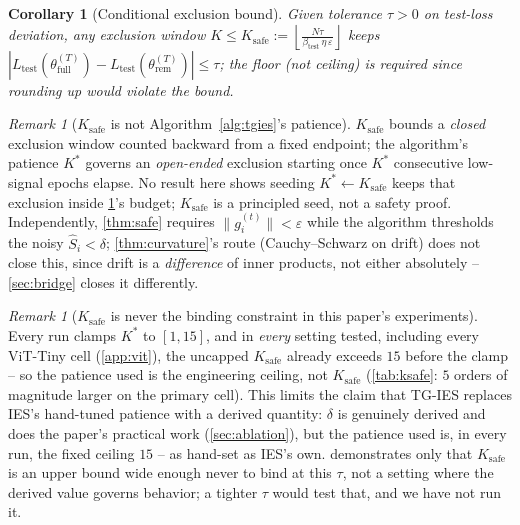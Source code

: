 \documentclass{article}
\theoremstyle{plain}
\newtheorem{corollary}[theorem]{Corollary}
\theoremstyle{definition}
\theoremstyle{remark}
\newtheorem{remark}[theorem]{Remark}
\begin{document}
\begin{corollary}[Conditional exclusion bound]
\label{cor:kstar}
Given tolerance $\tau>0$ on test-loss deviation, any exclusion window $K \le K_{\mathrm{safe}} := \left\lfloor \frac{N\tau}{\beta_{\mathrm{test}}\,\eta\,\varepsilon} \right\rfloor$ keeps $|L_{\mathrm{test}}(\theta^{(T)}_{\mathrm{full}})-L_{\mathrm{test}}(\theta^{(T)}_{\mathrm{rem}})|\le\tau$; the floor (not ceiling) is required since rounding up would violate the bound.
\end{corollary}
\begin{remark}[$K_{\mathrm{safe}}$ is not Algorithm~\ref{alg:tgies}'s patience]
\label{rem:kmismatch}
$K_{\mathrm{safe}}$ bounds a \emph{closed} exclusion window counted backward from a fixed endpoint; the algorithm's patience $K^*$ governs an \emph{open-ended} exclusion starting once $K^*$ consecutive low-signal epochs elapse. No result here shows seeding $K^*\leftarrow K_{\mathrm{safe}}$ keeps that exclusion inside \cref{cor:kstar}'s budget; $K_{\mathrm{safe}}$ is a principled seed, not a safety proof. Independently, \cref{thm:safe} requires $\|g_i^{(t)}\|<\varepsilon$ while the algorithm thresholds the noisy $\hat S_i<\delta$; \cref{thm:curvature}'s route (Cauchy--Schwarz on drift) does not close this, since drift is a \emph{difference} of inner products, not either absolutely -- \cref{sec:bridge} closes it differently.
\end{remark}

\begin{remark}[$K_{\mathrm{safe}}$ is never the binding constraint in this paper's experiments]
\label{rem:ksafe-nonbinding}
Every run clamps $K^*$ to $[1,15]$, and in \emph{every} setting tested, including every ViT-Tiny cell (\cref{app:vit}), the uncapped $K_{\mathrm{safe}}$ already exceeds $15$ before the clamp -- so the patience used is the engineering ceiling, not $K_{\mathrm{safe}}$ (\cref{tab:ksafe}: $5$ orders of magnitude larger on the primary cell). This limits the claim that TG-IES replaces IES's hand-tuned patience with a derived quantity: $\delta$ is genuinely derived and does the paper's practical work (\cref{sec:ablation}), but the patience used is, in every run, the fixed ceiling $15$ -- as hand-set as IES's own.  demonstrates only that $K_{\mathrm{safe}}$ is an upper bound wide enough never to bind at this $\tau$, not a setting where the derived value governs behavior; a tighter $\tau$ would test that, and we have not run it.
\end{remark}
\end{document}
